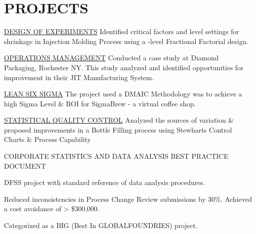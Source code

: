 \documentclass[]{bigfatnoob-resume}
\begin{document}
\begin{minipage}[t]{0.66\textwidth}
		\section{PROJECTS}
		\location{}
		\begin{tightemize}
			\item \href{http://sandeepmohan.com/files/DOE_Simulation.pdf}{\ibf DESIGN OF EXPERIMENTS} Identified critical factors and level settings for shrinkage in Injection Molding Process using a {-level Fractional Factorial design}. 
			\item \href{http://sandeepmohan.com/files/JIT_At_Diamond_Packaging.pdf}{\ibf OPERATIONS MANAGEMENT} Conducted a case study at Diamond Packaging, Rochester NY. This study analyzed and identified opportunities for improvement in their {\ibf JIT} Manufacturing System.
			\item \href{http://sandeepmohan.com/files/SigmaBrew_DMAIC.pdf}{\ibf LEAN SIX SIGMA} The project used a {\ibf DMAIC} Methodology was to achieve a high {\ibf Sigma Level} \& {\ibf ROI} for SigmaBrew - a virtual coffee shop.
			\item \href{http://sandeepmohan.com/files/SQC_Bottle_filling.pdf}{\ibf STATISTICAL QUALITY CONTROL} Analyzed the sources of variation \& proposed improvements in a Bottle Filling process using {\ibf Stewharts Control Charts} \& {\ibf Process Capability}
		\end{tightemize}
		\sectionsep
		
		\runsubsection{Industrial}
		\location{}
		\begin{tightemize}
			\item {\ibf CORPORATE STATISTICS AND DATA ANALYSIS BEST PRACTICE DOCUMENT}
			\begin{tightemize}
				\vspace{\topsep}
				\item {\ibf DFSS} project with standard reference of data analysis procedures.
				\item  Reduced inconsistencies in Process Change Review submissions by 30\%. Achieved a cost avoidance of > \$300,000.
				\item Categorized as a {\ibf BIG (Best In GLOBALFOUNDRIES)} project.
			\end{tightemize}
		\end{tightemize}
		\sectionsep
		
		

\end{minipage}
\end{document}
